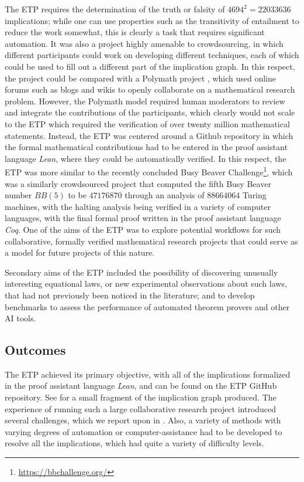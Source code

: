 The ETP requires the determination of the truth or falsity of $4694^2 = 22033636$ implications; while one can use properties such as the transitivity of entailment to reduce the work somewhat, this is clearly a task that requires significant automation. It was also a project highly amenable to crowdsourcing, in which different participants could work on developing different techniques, each of which could be used to fill out a different part of the implication graph. In this respect, the project could be compared with a Polymath project \cite{Gowers2009}, which used online forums such as blogs and wikis to openly collaborate on a mathematical research problem. However, the Polymath model required human moderators to review and integrate the contributions of the participants, which clearly would not scale to the ETP which required the verification of over twenty million mathematical statements. Instead, the ETP was centered around a Github repository in which the formal mathematical contributions had to be entered in the proof assistant language \emph{Lean}, where they could be automatically verified. In this respect, the ETP was more similar to the recently concluded Busy Beaver Challenge\footnote{\url{https://bbchallenge.org/}}, which was a similarly crowdsourced project that computed the fifth Busy Beaver number $BB(5)$ to be $47176870$ through an analysis of $88664064$ Turing machines, with the halting analysis being verified in a variety of computer languages, with the final formal proof written in the proof assistant language \emph{Coq}. One of the aims of the ETP was to explore potential workflows for such collaborative, formally verified mathematical research projects that could serve as a model for future projects of this nature.

Secondary aims of the ETP included the possibility of discovering unusually interesting equational laws, or new experimental observations about such laws, that had not previously been noticed in the literature; and to develop benchmarks to assess the performance of automated theorem provers and other AI tools.

\subsection{Outcomes}

The ETP achieved its primary objective, with all of the implications formalized in the proof assistant language \emph{Lean}, and can be found on the ETP GitHub repository.  See  for a small fragment of the implication graph produced. The experience of running such a large collaborative research project introduced several challenges, which we report upon in . Also, a variety of methods with varying degrees of automation or computer-assistance had to be developed to resolve all the implications, which had quite a variety of difficulty levels.

